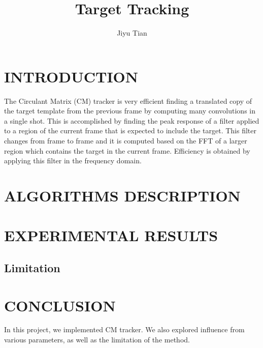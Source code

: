\documentclass[letterpaper, 10 pt, conference]{ieeeconf}
\title{\Huge Target Tracking}
\author{Jiyu Tian}
\begin{document}
\maketitle
\thispagestyle{empty}
\pagestyle{empty}


\section{INTRODUCTION}
The Circulant Matrix (CM) tracker is very efficient finding a translated copy of the target template from the previous frame by computing many convolutions in a single shot. This is accomplished by finding the peak response of a filter applied to a region of the current frame that is expected to include the target. This filter changes from frame to frame and it is computed based on the FFT of a larger region which contains the target in the current frame. Efficiency is obtained by applying this filter in the frequency domain. 



\section{ALGORITHMS DESCRIPTION}




\section{EXPERIMENTAL RESULTS}




\subsection{Limitation}

\section{CONCLUSION}
In this project, we implemented CM tracker. We also explored influence from various parameters, as well as the limitation of the method.
\vfill
\end{document}
